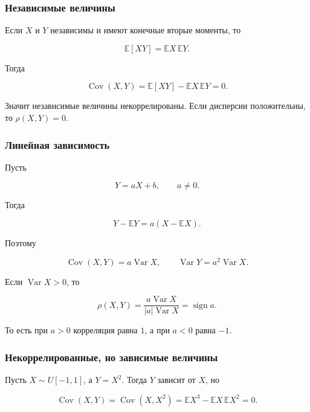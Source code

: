 \documentclass[
  11pt,
  a4paper,
]{article}
\begin{document}
\subsubsection{Независимые
величины}\label{ux43dux435ux437ux430ux432ux438ux441ux438ux43cux44bux435-ux432ux435ux43bux438ux447ux438ux43dux44b}

Если \(X\) и \(Y\) независимы и имеют конечные вторые моменты, то

\[
\mathbb E[XY]=\mathbb EX\,\mathbb EY.
\]

Тогда

\[
\operatorname{Cov}(X,Y)
=
\mathbb E[XY]-\mathbb EX\,\mathbb EY
=0.
\]

Значит независимые величины некоррелированы. Если дисперсии
положительны, то \(\rho(X,Y)=0\).

\subsubsection{Линейная
зависимость}\label{ux43bux438ux43dux435ux439ux43dux430ux44f-ux437ux430ux432ux438ux441ux438ux43cux43eux441ux442ux44c}

Пусть

\[
Y=aX+b,
\qquad a\ne0.
\]

Тогда

\[
Y-\mathbb EY
=
a(X-\mathbb EX).
\]

Поэтому

\[
\operatorname{Cov}(X,Y)=a\operatorname{Var}X,
\qquad
\operatorname{Var}Y=a^2\operatorname{Var}X.
\]

Если \(\operatorname{Var}X>0\), то

\[
\rho(X,Y)
=
\frac{a\operatorname{Var}X}{|a|\operatorname{Var}X}
=
\operatorname{sign}a.
\]

То есть при \(a>0\) корреляция равна \(1\), а при \(a<0\) равна \(-1\).

\subsubsection{Некоррелированные, но зависимые
величины}\label{ux43dux435ux43aux43eux440ux440ux435ux43bux438ux440ux43eux432ux430ux43dux43dux44bux435-ux43dux43e-ux437ux430ux432ux438ux441ux438ux43cux44bux435-ux432ux435ux43bux438ux447ux438ux43dux44b}

Пусть \(X\sim U[-1,1]\), а \(Y=X^2\). Тогда \(Y\) зависит от \(X\), но

\[
\operatorname{Cov}(X,Y)
=
\operatorname{Cov}(X,X^2)
=
\mathbb E X^3-\mathbb EX\,\mathbb EX^2
=0.
\]
\end{document}
